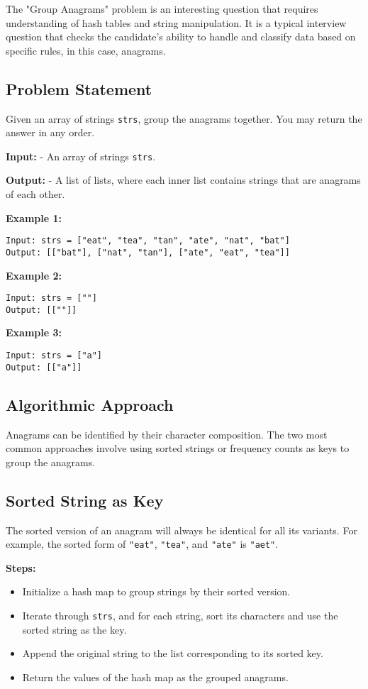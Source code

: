 
\label{problem:Group_Anagrams}
The "Group Anagrams" problem is an interesting question that requires understanding of hash tables and string manipulation. It is a typical interview question that checks the candidate's ability to handle and classify data based on specific rules, in this case, anagrams.
    
\subsection*{Problem Statement}
Given an array of strings \texttt{strs}, group the anagrams together. You may return the answer in any order.

\textbf{Input:}
- An array of strings \texttt{strs}.

\textbf{Output:}
- A list of lists, where each inner list contains strings that are anagrams of each other.

\textbf{Example 1:}
\begin{verbatim}
Input: strs = ["eat", "tea", "tan", "ate", "nat", "bat"]
Output: [["bat"], ["nat", "tan"], ["ate", "eat", "tea"]]
\end{verbatim}

\textbf{Example 2:}
\begin{verbatim}
Input: strs = [""]
Output: [[""]]
\end{verbatim}

\textbf{Example 3:}
\begin{verbatim}
Input: strs = ["a"]
Output: [["a"]]
\end{verbatim}

\subsection*{Algorithmic Approach}
Anagrams can be identified by their character composition. The two most common approaches involve using sorted strings or frequency counts as keys to group the anagrams.

\subsection*{Sorted String as Key}
The sorted version of an anagram will always be identical for all its variants. For example, the sorted form of \texttt{"eat"}, \texttt{"tea"}, and \texttt{"ate"} is \texttt{"aet"}. 

\textbf{Steps:}
\begin{itemize}
    \item Initialize a hash map to group strings by their sorted version.
    \item Iterate through \texttt{strs}, and for each string, sort its characters and use the sorted string as the key.
    \item Append the original string to the list corresponding to its sorted key.
    \item Return the values of the hash map as the grouped anagrams.
\end{itemize}

